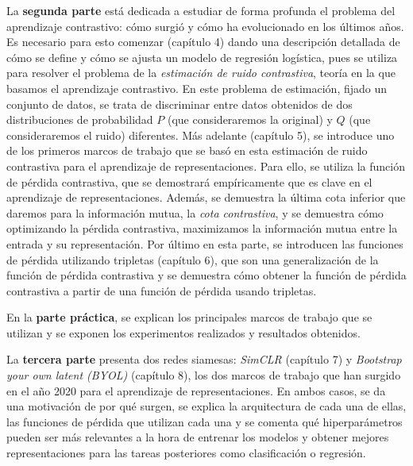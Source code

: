 La \textbf{segunda parte} está dedicada a estudiar de forma profunda el problema del aprendizaje contrastivo: cómo surgió y cómo ha evolucionado en los últimos años. Es necesario para esto comenzar (capítulo 4) dando una descripción detallada de cómo se define y cómo se ajusta un modelo de regresión logística, pues se utiliza para resolver el problema de la \emph{estimación de ruido contrastiva}, teoría en la que basamos el aprendizaje contrastivo. En este problema de estimación, fijado un conjunto de datos, se trata de discriminar entre datos obtenidos de dos distribuciones de probabilidad $P$ (que consideraremos la original) y $Q$ (que consideraremos el ruido) diferentes. Más adelante (capítulo 5), se introduce uno de los primeros marcos de trabajo que se basó en esta estimación de ruido contrastiva para el aprendizaje de representaciones. Para ello, se utiliza la función de pérdida contrastiva, que se demostrará empíricamente que es clave en el aprendizaje de representaciones. Además, se demuestra la última cota inferior que daremos para la información mutua, la \emph{cota contrastiva}, y se demuestra cómo optimizando la pérdida contrastiva, maximizamos la información mutua entre la entrada y su representación. Por último en esta parte, se introducen las funciones de pérdida utilizando tripletas (capítulo 6), que son una generalización de la función de pérdida contrastiva y se demuestra cómo obtener la función de pérdida contrastiva a partir de una función de pérdida usando tripletas.

En la \textbf{parte práctica}, se explican los principales marcos de trabajo que se utilizan y se exponen los experimentos realizados y resultados obtenidos.

La \textbf{tercera parte} presenta dos redes siamesas: \emph{SimCLR} (capítulo 7) y \emph{Bootstrap your own latent (BYOL)} (capítulo 8), los dos marcos de trabajo que han surgido en el año 2020 para el aprendizaje de representaciones. En ambos casos, se da una motivación de por qué surgen, se explica la arquitectura de cada una de ellas, las funciones de pérdida que utilizan cada una y se comenta qué hiperparámetros pueden ser más relevantes a la hora de entrenar los modelos y obtener mejores representaciones para las tareas posteriores como clasificación o regresión.

